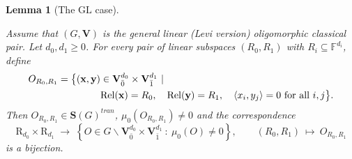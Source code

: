 \documentclass[11pt,a4paper]{amsart}
\theoremstyle{plain}%
\newtheorem{lemma}{Lemma}[subsection]
\theoremstyle{definition}
\theoremstyle{remark}
\newcommand{\V}{\mathbf{V}}
\newcommand{\F}{{\mathbb F}}
\newcommand{\Rel}{\mathrm{Rel}}
\newcommand{\Set}[1]{\mathbf{S}(#1)}
\begin{document}
\begin{lemma}[The $\mathrm{GL}$ case]\label{lem:rank-zero-orbits-levi}

Assume that $(G, \V)$ is the general linear (Levi version) oligomorphic classical pair.  
Let $d_0, d_1\geq 0$. For every pair of linear subspaces $(R_0, R_1)$ with $R_i\subseteq \F^{d_i}$, define
\begin{align}\label{eq:OR-levi-explicit}
 O_{R_0,R_1}=\bigl\{(\mathbf x,\mathbf y)&\in
 \mathbf V_{\bar 0}^{d_0}\times\mathbf V_{\bar 1}^{d_1} \ | \ \\
 &\Rel(\mathbf x)=R_0,\quad \Rel(\mathbf y)=R_1,
 \quad \langle x_i,y_j\rangle=0\text{ for all }i,j\bigr\}.\notag
\end{align}
Then $ O_{R_0,R_1} \in \Set{G}^{tran}$, ${\mu_0}( O_{R_0,R_1})\neq 0$ and the correspondence
$$ {\mathrm{R}_{d_0}\times \mathrm{R}_{d_1}}\;\longrightarrow\;\left\{O\in G\backslash \V_{\bar 0}^{d_0}\times\mathbf V_{\bar 1}^{d_1} ~:~\mu_0(O)\neq 0\right\}, \qquad (R_0, R_1)~\longmapsto ~ O_{R_0,R_1}$$
is a bijection.


\end{lemma}
\end{document}
